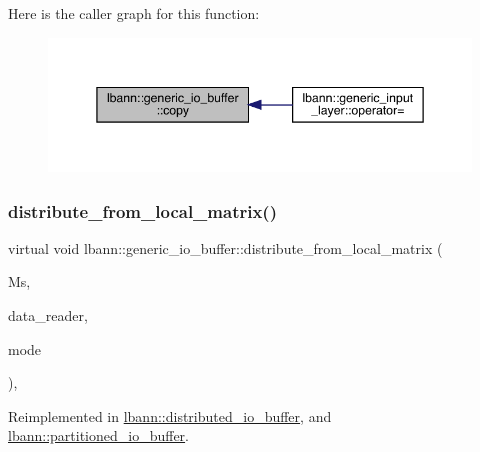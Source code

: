 Here is the caller graph for this function\+:\nopagebreak
\begin{figure}[H]
\begin{center}
\leavevmode
\includegraphics[width=345pt]{classlbann_1_1generic__io__buffer_a9d8020b82cf467c9148b0b37e7229262_icgraph}
\end{center}
\end{figure}
\mbox{\label{classlbann_1_1generic__io__buffer_a08c2bb93b86d2926df52ef9272a07d87}} 
\subsubsection{\texorpdfstring{distribute\+\_\+from\+\_\+local\+\_\+matrix()}{distribute\_from\_local\_matrix()}}
{\footnotesize\ttfamily virtual void lbann\+::generic\+\_\+io\+\_\+buffer\+::distribute\+\_\+from\+\_\+local\+\_\+matrix (\begin{DoxyParamCaption}\item[{\hyperlink{base_8hpp_a9a697a504ae84010e7439ffec862b470}{Abs\+Dist\+Mat} \&}]{Ms,  }\item[{\hyperlink{classlbann_1_1generic__data__reader}{generic\+\_\+data\+\_\+reader} $\ast$}]{data\+\_\+reader,  }\item[{\hyperlink{base_8hpp_a2781a159088df64ed7d47cc91c4dc0a8}{execution\+\_\+mode}}]{mode }\end{DoxyParamCaption})\hspace{0.3cm}{\ttfamily [inline]}, {\ttfamily [virtual]}}



Reimplemented in \hyperlink{classlbann_1_1distributed__io__buffer_a3a770ec2314313761d6f0eccdb9dc09b}{lbann\+::distributed\+\_\+io\+\_\+buffer}, and \hyperlink{classlbann_1_1partitioned__io__buffer_a906b8b13a8b9a9e8080d4e4d4bba25bc}{lbann\+::partitioned\+\_\+io\+\_\+buffer}.



